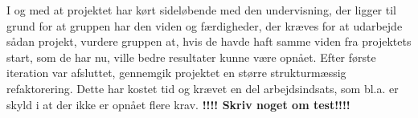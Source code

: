 I og med at projektet har kørt sideløbende med den undervisning, der ligger til
grund for at gruppen har den viden og færdigheder, der kræves for at udarbejde
sådan projekt, vurdere gruppen at, hvis de havde haft samme viden fra projektets
start, som de har nu, ville bedre resultater kunne være opnået. Efter første
iteration var afsluttet, gennemgik projektet en større strukturmæssig
refaktorering. Dette har kostet tid og krævet en del arbejdsindsats, som bl.a.
er skyld i at der ikke er opnået flere krav. 
\textbf{!!!! Skriv noget om test!!!!}
